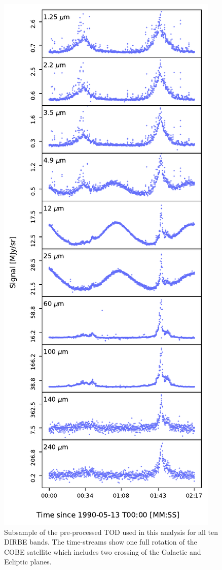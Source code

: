 \documentclass[twocolumn]{aa}
\begin{document}
\begin{figure}
    \centering
    \includegraphics[width=\columnwidth]{figs/tod.pdf}
    \caption{Subsample of the pre-processed TOD used in this analysis for all ten DIRBE bands. The time-streams
    show one full rotation of the COBE satellite which includes two crossing of the Galactic and Ecliptic planes.}
    \label{fig:tod_zodi}
\end{figure}
\end{document}

